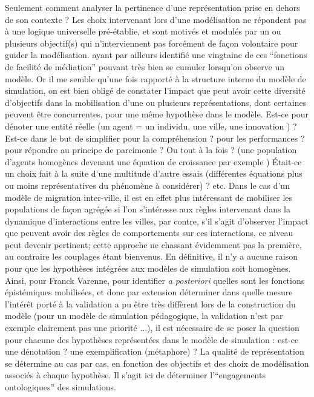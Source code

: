 Seulement comment analyser la pertinence d'une représentation prise en dehors de son contexte ? Les choix intervenant lors d'une modélisation ne répondent pas à une logique universelle pré-établie, et sont motivés et modulés par un ou plusieurs objectif(s) qui n’interviennent pas forcément de façon volontaire pour guider la modélisation. \textcite{Varenne2013b} ayant par ailleurs identifié une vingtaine de ces \enquote{fonctions de facilité de médiation} pouvant très bien se cumuler lorsqu’on observe un modèle. Or il me semble qu'une fois rapporté à la structure interne du modèle de simulation, on est bien obligé de constater l'impact que peut avoir cette diversité d'objectifs dans la mobilisation d’une ou plusieurs représentations, dont certaines peuvent être concurrentes, pour une même hypothèse dans le modèle. Est-ce pour dénoter une entité réelle (un agent = un individu, une ville, une innovation ) ? Est-ce dans le but de simplifier pour la compréhension ? pour les performances ? pour répondre au principe de parcimonie ? Ou tout à la fois ? (une population d'agents homogènes devenant une équation de croissance par exemple ) Était-ce un choix fait à la suite d’une multitude d'autre essais (différentes équations plus ou moins représentatives du phénomène à considérer) ? etc. Dans le cas d'un modèle de migration inter-ville, il est en effet plus intéressant de mobiliser les populations de façon agrégée si l'on s'intéresse aux règles intervenant dans la dynamique d'interactions entre les villes, par contre, s'il s'agit d'observer l'impact que peuvent avoir des règles de comportements sur ces interactions, ce niveau peut devenir pertinent; cette approche ne chassant évidemment pas la première, au contraire les couplages étant bienvenus. En définitive, il n'y a aucune raison pour que les hypothèses intégrées aux modèles de simulation soit homogènes. Ainsi, pour Franck Varenne, pour identifier \textit{a posteriori} quelles sont les fonctions épistémiques mobilisées, et donc par extension déterminer dans quelle mesure l'intérêt porté à la validation a pu être très diffèrent lors de la construction du modèle (pour un modèle de simulation pédagogique, la validation n’est par exemple clairement pas une priorité ...), il est nécessaire de se poser la question pour chacune des hypothèses représentées dans le modèle de simulation : est-ce une dénotation ? une exemplification (métaphore) ? La qualité de représentation se détermine au cas par cas, en fonction des objectifs et des choix de modélisation associés à chaque hypothèse. Il s'agit ici de déterminer l'\enquote{engagements ontologiques} des simulations.

